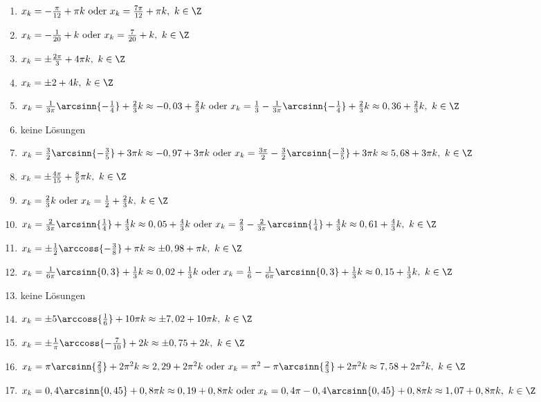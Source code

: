 \begin{Answer}[ref=sincosGleichungenAllgA1]
	\begin{enumerate}[label=\alph*)]
		\item \(x_k=-\frac{\pi}{12} +\pi k\text{ oder }x_k=\frac{7\pi}{12} +\pi k,\ k\in\Z\)
		\item \(x_k=-\frac{1}{20} + k\text{ oder }x_k=\frac{7}{20} + k,\ k\in\Z\)
		\item \(x_k=\pm \frac{2\pi}{3} +4\pi k,\ k\in\Z\)
		\item \(x_k=\pm 2 +4 k,\ k\in\Z\)
		\item \(x_k=\frac{1}{3\pi}\arcsinn{-\frac{1}{4}} +\frac{2}{3} k\approx -0,03+\frac{2}{3} k\text{ oder }x_k=\frac{1}{3}-\frac{1}{3\pi}\arcsinn{-\frac{1}{4}} +\frac{2}{3} k\approx 0,36+\frac{2}{3} k,\ k\in\Z\)
		\item keine Lösungen
		\item \(x_k=\frac{3}{2}\arcsinn{-\frac{3}{5}} +3\pi k\approx -0,97+3\pi k\text{ oder }x_k=\frac{3\pi}{2}-\frac{3}{2}\arcsinn{-\frac{3}{5}} +3\pi k\approx 5,68+3\pi k,\ k\in\Z\)
		\item \(x_k=\pm \frac{4\pi}{15} +\frac{8}{5}\pi k,\ k\in\Z\)
		\item \(x_k=\frac{2}{3} k\text{ oder }x_k=\frac{1}{2} +\frac{2}{3} k,\ k\in\Z\)
		\item \(x_k=\frac{2}{3\pi}\arcsinn{\frac{1}{4}} +\frac{4}{3} k\approx 0,05+\frac{4}{3} k\text{ oder }x_k=\frac{2}{3}-\frac{2}{3\pi}\arcsinn{\frac{1}{4}} +\frac{4}{3} k\approx 0,61+\frac{4}{3} k,\ k\in\Z\)
		\item \(x_k=\pm \frac{1}{2}\arccoss{-\frac{3}{8}} +\pi k\approx\pm 0,98 +\pi k,\ k\in\Z\)
		\item \(x_k=\frac{1}{6\pi}\arcsinn{0,3} +\frac{1}{3} k\approx 0,02+\frac{1}{3} k\text{ oder }x_k=\frac{1}{6}-\frac{1}{6\pi}\arcsinn{0,3} +\frac{1}{3} k\approx 0,15+\frac{1}{3} k,\ k\in\Z\)
		\item keine Lösungen
		\item \(x_k=\pm 5\arccoss{\frac{1}{6}} +10\pi k\approx\pm 7,02 +10\pi k,\ k\in\Z\)
		\item \(x_k=\pm \frac{1}{\pi}\arccoss{-\frac{7}{10}} +2k\approx\pm 0,75 +2k,\ k\in\Z\)
		\item \(x_k=\pi\arcsinn{\frac{2}{3}} +2\pi^2 k\approx 2,29+2\pi^2 k\text{ oder }x_k=\pi^2-\pi\arcsinn{\frac{2}{3}} +2\pi^2 k\approx 7,58+2\pi^2 k,\ k\in\Z\)
		\item \(x_k=0,4\arcsinn{0,45} +0,8\pi k\approx 0,19+0,8\pi k\text{ oder }x_k=0,4\pi-0,4\arcsinn{0,45} +0,8\pi k\approx 1,07+0,8\pi k,\ k\in\Z\)

\end{enumerate}
\end{Answer}
